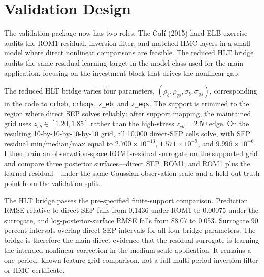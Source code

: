 \documentclass[12pt]{article}
\theoremstyle{plain}
\theoremstyle{definition}
\theoremstyle{remark}
\begin{document}
\section{Validation Design}
\label{sec:validation_design}

The validation package now has two roles. The Gal\'i (2015) hard-ELB exercise audits the ROM1-residual, inversion-filter, and matched-HMC layers in a small model where direct nonlinear comparisons are feasible. The reduced HLT bridge audits the same residual-learning target in the model class used for the main application, focusing on the investment block that drives the nonlinear gap.

The reduced HLT bridge varies four parameters, $(\rho_b,\rho_{qs},\sigma_b,\sigma_{qs})$, corresponding in the code to \texttt{crhob}, \texttt{crhoqs}, \texttt{z\_eb}, and \texttt{z\_eqs}. The support is trimmed to the region where direct SEP solves reliably: after support mapping, the maintained grid uses $z_{eb} \in [1.20,1.85]$ rather than the high-stress $z_{eb}=2.50$ edge. On the resulting 10-by-10-by-10-by-10 grid, all 10{,}000 direct-SEP cells solve, with SEP residual min/median/max equal to $2.700\times 10^{-13}$, $1.571\times 10^{-9}$, and $9.996\times 10^{-6}$. I then train an observation-space ROM1-residual surrogate on the supported grid and compare three posterior surfaces---direct SEP, ROM1, and ROM1 plus the learned residual---under the same Gaussian observation scale and a held-out truth point from the validation split.

The HLT bridge passes the pre-specified finite-support comparison. Prediction RMSE relative to direct SEP falls from 0.1436 under ROM1 to 0.00075 under the surrogate, and log-posterior-surface RMSE falls from 88.07 to 0.053. Surrogate 90 percent intervals overlap direct SEP intervals for all four bridge parameters. The bridge is therefore the main direct evidence that the residual surrogate is learning the intended nonlinear correction in the medium-scale application. It remains a one-period, known-feature grid comparison, not a full multi-period inversion-filter or HMC certificate.
\end{document}
